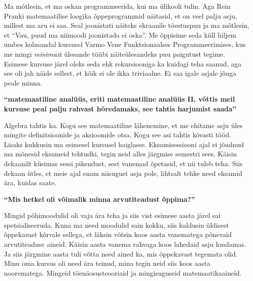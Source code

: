 Ma mõtlesin, et ma oskan programmeerida, kui ma ülikooli tulin. Aga Rein
Pranki matemaatilise loogika õppeprogrammid näitasid,
et on veel palju asju, millest ma aru ei saa. Seal joonistati näiteks ekraanile
tõestuspuu ja ma mõtlesin, et \enquote{Vau, puud ma niimoodi joonistada ei
oska}. Me õppisime seda küll hiljem umbes kolmandal kursusel Varmo
Vene Funktsionaalses Programmeerimises, kus me mingi
\emph{minimax}i ülesande tüübi näiteülesandeks puu paigutust tegime. Esimese
kursuse järel oleks seda ehk rekursiooniga ka kuidagi teha saanud, aga see oli
jah näide sellest, et kõik ei ole ikka triviaalne. Ei saa igale asjale jõuga
peale minna.

\textbf{\enquote{matemaatiline analüüs, eriti matemaatiline analüüs II, võttis
meil kursuse peal palju rahvast hõredamaks, see tahtis harjumist saada}}

Algebra tahtis ka. Kogu see matemaatiline lähenemine, et me ehitame asju üles
mingite definitsioonide ja aksioomide otsa. Kogu see asi tahtis kõvasti tööd.
Lisaks kukkusin ma esimesel kursusel haiglasse. Eksamisessiooni ajal ei jõudnud
ma mõnesid eksameid tehtudki, tegin neid alles järgmise semestri sees. Käisin
dekaanilt küsimas sessi pikendust, sest vanemad õpetasid, et nii tuleb teha.
Siis dekaan ütles, et meie ajal enam niisugust asja pole, lihtsalt tehke need
eksamid ära, kuidas saate.

\textbf{\enquote{Mis hetkel oli võimalik minna arvutiteadust õppima?}}

Mingid põhimoodulid oli vaja ära teha ja siis vist esimese aasta järel sai
spetsialiseeruda. Kuna ma need moodulid sain kokku, siis kaldusin üldisest
õppekavast kõrvale sellega, et läksin võtsin koos aasta vanematega põnevaid
arvutiteaduse aineid. Käisin aasta vanema rahvaga koos lahedaid asju kuulamas.
Ja siis järgmine aasta tuli võtta need ained ka, mis õppekavast tegemata olid.
Minu oma kursus oli need ära teinud, mina tegin neid siis koos aasta
noorematega. Mingeid tõenäosusteooriaid ja mingisuguseid matemaatikaaineid.


